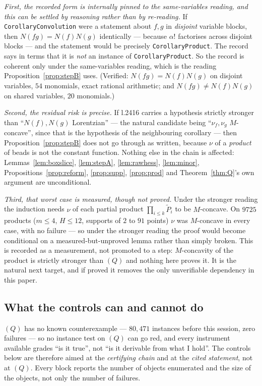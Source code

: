 \documentclass[11pt]{article}
\theoremstyle{plain}
\theoremstyle{definition}
\newcommand{\Pt}{\widetilde P}
\begin{document}
\emph{First, the recorded form is internally pinned to the same-variables reading, and this
can be settled by reasoning rather than by re-reading.} If \verb|CorollaryConvolution| were
a statement about $f,g$ in \emph{disjoint} variable blocks, then $N(fg)=N(f)N(g)$
identically --- because $\alpha!$ factorises across disjoint blocks --- and the statement
would be precisely \verb|CorollaryProduct|. The record says in terms that it is \emph{not}
an instance of \verb|CorollaryProduct|. So the record is coherent only under the
same-variables reading, which is the reading Proposition~\ref{prop:stepB} uses. (Verified:
$N(fg)=N(f)N(g)$ on disjoint variables, $54$ monomials, exact rational arithmetic; and
$N(fg)\ne N(f)N(g)$ on shared variables, $20$ monomials.)

\emph{Second, the residual risk is precise.} If l.2416 carries a hypothesis strictly
stronger than ``$N(f),N(g)$ Lorentzian'' --- the natural candidate being
``$\nu_f,\nu_g$ $M$-concave'', since that is the hypothesis of the neighbouring corollary
--- then Proposition~\ref{prop:stepB} does not go through as written, because $\nu$ of a
\emph{product} of beads is not the constant function. Nothing else in the chain is
affected: Lemmas~\ref{lem:boxslice}, \ref{lem:stepA}, \ref{lem:rawhess},
\ref{lem:minor}, Propositions~\ref{prop:reform}, \ref{prop:supp}, \ref{prop:prod} and
Theorem~\ref{thm:Q}'s own argument are unconditional.

\emph{Third, that worst case is measured, though not proved.} Under the stronger reading
the induction needs $\nu$ of each partial product $\prod_{i\le k}\Pt_i$ to be $M$-concave.
On $9725$ products ($m\le4$, $H\le12$, supports of $2$ to $91$ points) $\nu$ was
$M$-concave in every case, with no failure --- so under the stronger reading the proof
would become conditional on a measured-but-unproved lemma rather than simply broken. This
is recorded as a measurement, not promoted to a step: $M$-concavity of the product is
strictly stronger than $(Q)$ and nothing here proves it. It is the natural next target,
and if proved it removes the only unverifiable dependency in this paper.

\subsection*{What the controls can and cannot do}

$(Q)$ has no known counterexample --- $80{,}471$ instances before this session, zero
failures --- so no instance test on $(Q)$ can go red, and every instrument available
grades ``is it true'', not ``is it derivable from what I hold''. The controls below are
therefore aimed at the \emph{certifying chain} and at the \emph{cited statement}, not at
$(Q)$. Every block reports the number of objects enumerated and the size of the objects,
not only the number of failures.
\end{document}
